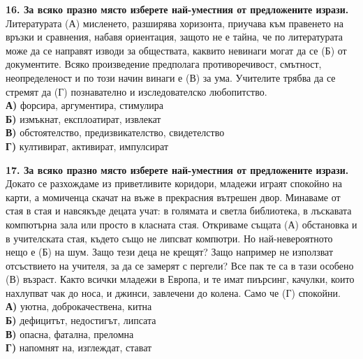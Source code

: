 \documentclass[12pt,a4paper]{article}
\begin{document}
\noindent
\textbf{16. За всяко празно място изберете най-уместния от предложените изрази.} \\
\noindent
Литературата \makebox[2cm]{\dotfill} (А) мисленето, разширява хоризонта, приучава към правенето на връзки и сравнения, набавя ориентация, защото не е тайна, че по литературата може да се направят изводи за обществата, каквито невинаги могат да се \makebox[2cm]{\dotfill} (Б) от документите. Всяко произведение предполага противоречивост, смътност, неопределеност и по този начин винаги е \makebox[2cm]{\dotfill} (В) за ума. Учителите трябва да се стремят да \makebox[2cm]{\dotfill} (Г) познавателно и изследователско любопитство. \\
\noindent
\textbf{А)} форсира, аргументира, стимулира \\
\textbf{Б)} измъкнат, експлоатират, извлекат \\
\textbf{В)} обстоятелство, предизвикателство, свидетелство \\
\textbf{Г)} култивират, активират, импулсират

\vspace{0.6cm}

\noindent
\textbf{17. За всяко празно място изберете най-уместния от предложените изрази.} \\
\noindent
Докато се разхождаме из приветливите коридори, младежи играят спокойно на карти, а момиченца скачат на въже в прекрасния вътрешен двор. Минаваме от стая в стая и навсякъде децата учат: в голямата и светла библиотека, в лъскавата компютърна зала или просто в класната стая. Откриваме същата \makebox[2cm]{\dotfill} (А) обстановка и в учителската стая, където също не липсват компютри. Но най-невероятното нещо е \makebox[2cm]{\dotfill} (Б) на шум. Защо тези деца не крещят? Защо например не използват отсъствието на учителя, за да се замерят с пергели? Все пак те са в тази особено \makebox[2cm]{\dotfill} (В) възраст. Както всички младежи в Европа, и те имат пиърсинг, качулки, които нахлупват чак до носа, и джинси, завлечени до колена. Само че \makebox[2cm]{\dotfill} (Г) спокойни. \\
\noindent
\textbf{А)} уютна, доброкачествена, китна \\
\textbf{Б)} дефицитът, недостигът, липсата \\
\textbf{В)} опасна, фатална, преломна \\
\textbf{Г)} напомнят на, изглеждат, стават

\vspace{0.6cm}
\end{document}
